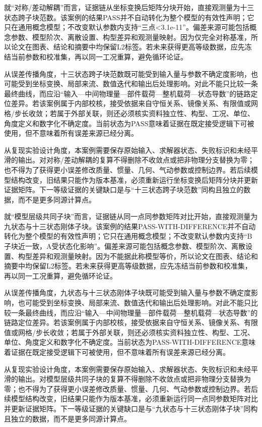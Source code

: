 \documentclass[UTF8,12pt,openany]{ctexbook}
\begin{document}
就“对称/差动解耦”而言，证据链从坐标变换后矩阵分块开始，直接观测量为十三状态跨子块范数。该案例的结果PASS并不自动转化为整个模型的有效性声明；它只在通用概念模型；不改变默认参数内支持“三点<3.1e-11”。偏差来源可能包括概念参数、模型阶次、离散设置、构型差异和观测量映射。因为仅完全对称基准，所以论文在图表、结论和摘要中均保留L2标签。若未来获得更高等级数据，应先冻结当前参数和校准集，再以同一工况重算，避免循环论证。

从误差传播角度，十三状态跨子块范数既可能受到输入量与参数不确定度影响，也可能受到坐标变换、局部来流、数值迭代和输出后处理影响。对此不能只比较一条最终曲线，而应沿“输入—中间物理量—部件载荷—整机载荷—状态导数”的链路定位差异。若该案例属于内部校核，接受依据来自守恒关系、镜像关系、有限值或网格/步长收敛；若属于外部关联，则还必须核实资料独立性、构型、工况、单位、角度定义和数字化不确定度。当前状态为PASS意味着证据在既定接受逻辑下可被使用，但不意味着所有误差来源已经分离。

从复现实验设计角度，本案例需要保存原始输入、求解器状态、失败标识和未经平滑的输出。对对称/差动解耦的复算不得删除不收敛点或把非物理分支替换为零；也不得为了获得更小误差修改质量、惯量、几何、气动参数或控制边界。若后续模型结构改变，旧结果只能作为版本基准，必须重新运行坐标变换后矩阵分块并更新证据矩阵。下一等级证据的关键缺口是与“十三状态跨子块范数”同构且独立的数据，而不是更多同源计算点。

就“模型层级共同子块”而言，证据链从同一点同参数矩阵对比开始，直接观测量为九状态与十三状态刚体子块。该案例的结果PASS-WITH-DIFFERENCE并不自动转化为整个模型的有效性声明；它只在通用概念模型；不改变默认参数内支持“B子块近一致，A受状态化影响”。偏差来源可能包括概念参数、模型阶次、离散设置、构型差异和观测量映射。因为不能据此称模型等价，所以论文在图表、结论和摘要中均保留L2标签。若未来获得更高等级数据，应先冻结当前参数和校准集，再以同一工况重算，避免循环论证。

从误差传播角度，九状态与十三状态刚体子块既可能受到输入量与参数不确定度影响，也可能受到坐标变换、局部来流、数值迭代和输出后处理影响。对此不能只比较一条最终曲线，而应沿“输入—中间物理量—部件载荷—整机载荷—状态导数”的链路定位差异。若该案例属于内部校核，接受依据来自守恒关系、镜像关系、有限值或网格/步长收敛；若属于外部关联，则还必须核实资料独立性、构型、工况、单位、角度定义和数字化不确定度。当前状态为PASS-WITH-DIFFERENCE意味着证据在既定接受逻辑下可被使用，但不意味着所有误差来源已经分离。

从复现实验设计角度，本案例需要保存原始输入、求解器状态、失败标识和未经平滑的输出。对模型层级共同子块的复算不得删除不收敛点或把非物理分支替换为零；也不得为了获得更小误差修改质量、惯量、几何、气动参数或控制边界。若后续模型结构改变，旧结果只能作为版本基准，必须重新运行同一点同参数矩阵对比并更新证据矩阵。下一等级证据的关键缺口是与“九状态与十三状态刚体子块”同构且独立的数据，而不是更多同源计算点。
\end{document}
